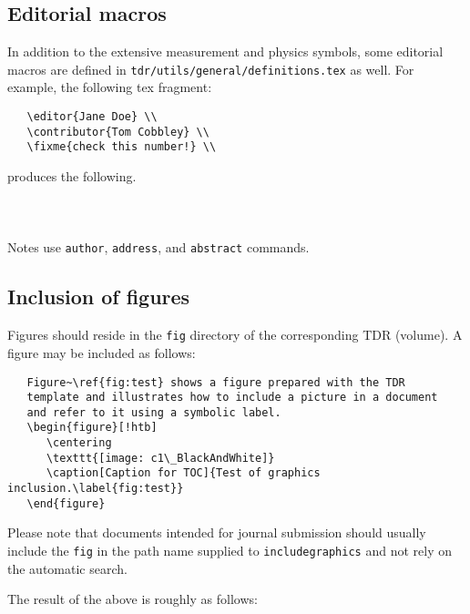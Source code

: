 \subsection{Editorial macros}


In addition to the extensive measurement and physics symbols,
some editorial macros are defined in
\texttt{tdr/utils/general/definitions.tex} as well.
For example, the following tex fragment:
\begin{verbatim}
   \editor{Jane Doe} \\
   \contributor{Tom Cobbley} \\
   \fixme{check this number!} \\
\end{verbatim}
%
produces the following. \\
\bigbreak
{}\mbox{~}\\
\mbox{~} \\
\mbox{~}\\

Notes use \texttt{author}, \texttt{address}, and \texttt{abstract} commands.



\subsection{Inclusion of figures}

Figures should reside in the \texttt{fig} directory of the corresponding TDR (volume).
A figure may be included as follows:
%
\begin{verbatim}
   Figure~\ref{fig:test} shows a figure prepared with the TDR
   template and illustrates how to include a picture in a document
   and refer to it using a symbolic label.
   \begin{figure}[!htb]
      \centering
      \texttt{[image: c1\_BlackAndWhite]}
      \caption[Caption for TOC]{Test of graphics inclusion.\label{fig:test}}
   \end{figure}
\end{verbatim}
%
Please note that documents intended for journal submission should usually include the \texttt{fig} in the path name supplied to \texttt{includegraphics} and not rely on the automatic search.

The result of the above is roughly as follows:
%

